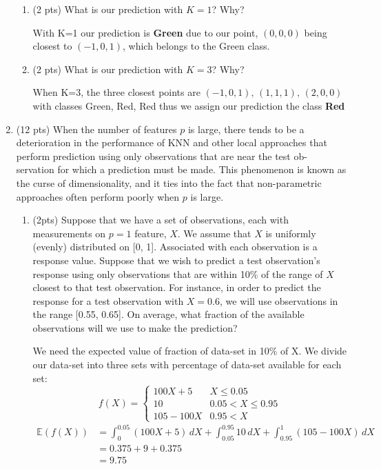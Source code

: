 \documentclass[a4paper]{article}
\theoremstyle{definition}
\newenvironment{soln}{
    \leavevmode\color{blue}\ignorespaces
}{}
\begin{document}
\begin{enumerate}
\begin{enumerate}
	\item (2 pts) What is our prediction with $K=1$? Why?
	
	\begin{soln}
            With K=1 our prediction is \textbf{Green} due to our point, $(0,0,0)$ being closest to $(-1,0,1)$, which belongs to the Green class.
        \end{soln}
	
	\item (2 pts) What is our prediction with $K=3$? Why?
	
	\begin{soln}
            When K=3, the three closest points are $(-1,0,1),\,(1,1,1),\,(2,0,0)$ with classes Green, Red, Red thus we assign our prediction the class \textbf{Red}
        \end{soln}

\end{enumerate}

\item (12 pts) When the number of features $p$ is large, there tends to be a deterioration in the performance of KNN and other local approaches that perform prediction using only observations that are near the test ob- servation for which a prediction must be made. This phenomenon is known as the curse of dimensionality, and it ties into the fact that non-parametric approaches often perform poorly when $p$ is large.

\begin{enumerate}
	\item (2pts) Suppose that we have a set of observations, each with measurements on $p=1$ feature, $X$. We assume that $X$ is uniformly (evenly) distributed on [0, 1]. Associated with each observation is a response value. Suppose that we wish to predict a test observation’s response using only observations that are within 10\% of the range of $X$ closest to that test observation. For instance, in order to predict the response for a test observation with $X=0.6$, we will use observations in the range [0.55, 0.65]. On average, what fraction of the available observations will we use to make the prediction?
	
	\begin{soln}
            We need the expected value of fraction of data-set in 10\% of X. We divide our data-set into three sets with percentage of data-set available for each set:
            \[
            f(X) = \begin{cases}
            100X + 5 & X\leq0.05\\
            10 & 0.05<X\leq0.95\\
            105 - 100X & 0.95<X
            \end{cases}
            \]
            \begin{align*}
                \mathbb{E}(f(X)) &= \int_{0}^{0.05} (100X +5)\,dX + \int_{0.05}^{0.95} 10\,dX +\int_{0.95}^{1} (105 - 100X)\,dX \\
                &= 0.375 + 9 + 0.375\\
                &= 9.75
            \end{align*}
            

\end{soln}
\end{enumerate}
\end{enumerate}
\end{document}
